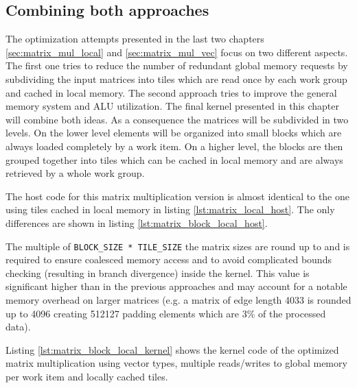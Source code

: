 \subsection{Combining both approaches}
The optimization attempts presented in the last two chapters \ref{sec:matrix_mul_local} and \ref{sec:matrix_mul_vec} focus on two different aspects. The first one tries to reduce the number of redundant global memory requests by subdividing the input matrices into tiles which are read once by each work group and cached in local memory. The second approach tries to improve the general memory system and ALU utilization. The final kernel presented in this chapter will combine both ideas.
As a consequence the matrices will be subdivided in two levels. On the lower level elements will be organized into small blocks which are always loaded completely by a work item. On a higher level, the blocks are then grouped together into tiles which can be cached in local memory and are always retrieved by a whole work group.

The host code for this matrix multiplication version is almost identical to the one using tiles cached in local memory in listing \ref{lst:matrix_local_host}. The only differences are shown in listing \ref{lst:matrix_block_local_host}.



The multiple of \lstinline!BLOCK_SIZE * TILE_SIZE! the matrix sizes are round up to and is required to ensure coalesced memory access and to avoid complicated bounds checking (resulting in branch divergence) inside the kernel. This value is significant higher than in the previous approaches and may account for a notable memory overhead on larger matrices (e.g. a matrix of edge length 4033 is rounded up to 4096 creating 512127 padding elements which are 3\% of the processed data).

Listing \ref{lst:matrix_block_local_kernel} shows the kernel code of the optimized matrix multiplication using vector types, multiple reads/writes to global memory per work item and locally cached tiles.

\pagebreak

